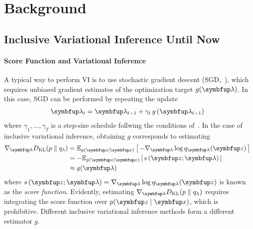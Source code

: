 
\section{Background}
\vspace{-0.05in}
\subsection{Inclusive Variational Inference Until Now}\label{section:ivi_previous}
\vspace{-0.05in}
\paragraph{Score Function and Variational Inference}
A typical way to perform VI is to use stochastic gradient descent (SGD,~\citealt{robbins_stochastic_1951, bottou_online_1999}), which requires unbiased gradient estimates of the optimization target \(g(\vlambda)\).
In this case, SGD can be performed by repeating the update
\begin{align}
  \vlambda_{t} = \vlambda_{t-1} + \gamma_{t} \, g\left(\vlambda_{t-1}\right)
\end{align}
where \(\gamma_1, \ldots, \gamma_T\) is a step-size schedule follwing the conditions of~\citet{robbins_stochastic_1951, bottou_online_1999}.
In the case of inclusive variational inference, obtaining \(g\) corresponds to estimating
%
\vspace{-0.05in}
\begin{align}
  \nabla_{\vlambda} \DKL{p}{q_{\lambda}}
  &= \Esub{p(\vz\mid\vx)}{ - \nabla_{\vlambda} \log q_{\vlambda}(\vz) } \\
  &= - \Esub{p(\vz\mid\vx)}{ s\,(\vz; \vlambda) } \\
  &\approx g(\vlambda)
\end{align}
%
where \(s\,(\vz; \vlambda) = \nabla_{\vlambda} \log q_{\vlambda}(\vz)\) is known as the \textit{score function}.
Evidently, estimating \(\nabla_{\vlambda} \DKL{p}{q_{\lambda}}\) requires integrating the score function over \(p(\vz\mid\vx)\), which is prohibitive.
Different inclusive variational inference methods form a different estimator \(g\).

\vspace{-0.05in}
